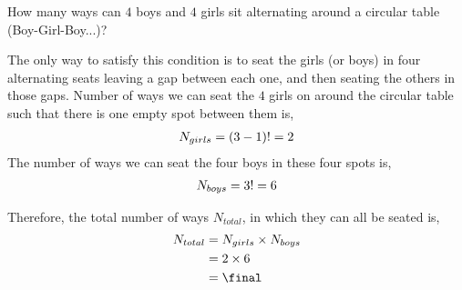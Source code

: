 
\gcalcexpr[0]\final{\vbthree * \vbtwo}

\question[4] How many ways can $4$ boys and $4$ girls sit alternating around a circular table (Boy-Girl-Boy...)?


\ifprintanswers
\fi 

\begin{solution}[\halfpage]
  The only way to satisfy this condition is to seat the girls (or boys) in four alternating seats leaving a gap between each one, and then seating the others in those gaps. Number of ways we can seat the $4$ girls on around the circular table such that there is one empty spot between them is,
  \begin{align}
    N_{girls} = (3-1)! = 2 
  \end{align}
  The number of ways we can seat the four boys in these four spots is,
  \begin{align}
    N_{boys} = 3! = 6
  \end{align}

  Therefore, the total number of ways $N_{total}$, in which they can all be seated is,
    \begin{align}
      N_{total} &= N_{girls} \times N_{boys} \\
                &= \vbtwo \times \vbthree \\
                &= \final 
    \end{align}

\end{solution}

